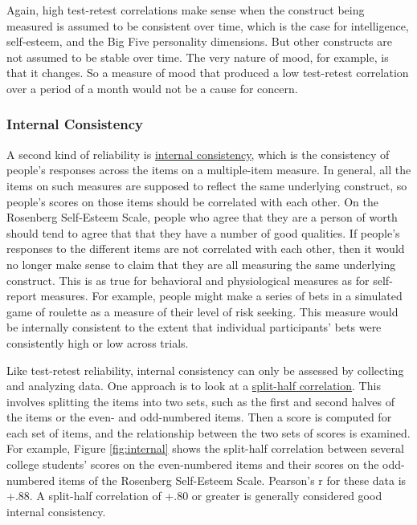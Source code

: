 \documentclass[
]{krantz}
\begin{document}
Again, high test-retest correlations make sense when the construct being measured is assumed to be consistent over time, which is the case for intelligence, self-esteem, and the Big Five personality dimensions. But other constructs are not assumed to be stable over time. The very nature of mood, for example, is that it changes. So a measure of mood that produced a low test-retest correlation over a period of a month would not be a cause for concern.

\subsubsection*{Internal Consistency}\label{internal-consistency}


A second kind of reliability is \hyperref[internal-consistency]{internal consistency}, which is the consistency of people's responses across the items on a multiple-item measure. In general, all the items on such measures are supposed to reflect the same underlying construct, so people's scores on those items should be correlated with each other. On the Rosenberg Self-Esteem Scale, people who agree that they are a person of worth should tend to agree that that they have a number of good qualities. If people's responses to the different items are not correlated with each other, then it would no longer make sense to claim that they are all measuring the same underlying construct. This is as true for behavioral and physiological measures as for self-report measures. For example, people might make a series of bets in a simulated game of roulette as a measure of their level of risk seeking. This measure would be internally consistent to the extent that individual participants' bets were consistently high or low across trials.

Like test-retest reliability, internal consistency can only be assessed by collecting and analyzing data. One approach is to look at a \hyperref[split-half-correlation]{split-half correlation}. This involves splitting the items into two sets, such as the first and second halves of the items or the even- and odd-numbered items. Then a score is computed for each set of items, and the relationship between the two sets of scores is examined. For example, Figure \ref{fig:internal} shows the split-half correlation between several college students' scores on the even-numbered items and their scores on the odd-numbered items of the Rosenberg Self-Esteem Scale. Pearson's r for these data is +.88. A split-half correlation of +.80 or greater is generally considered good internal consistency.
\end{document}
